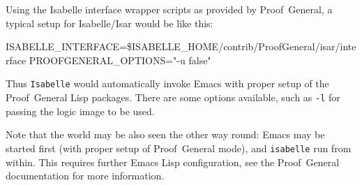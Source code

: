 Using the Isabelle interface wrapper scripts as provided by Proof~General, a
typical setup for Isabelle/Isar would be like this:
\begin{ttbox}
ISABELLE_INTERFACE=\$ISABELLE_HOME/contrib/ProofGeneral/isar/interface
PROOFGENERAL_OPTIONS="-u false"
\end{ttbox}
Thus \texttt{Isabelle} would automatically invoke Emacs with proper setup of
the Proof~General Lisp packages.  There are some options available, such as
\texttt{-l} for passing the logic image to be used.

\medskip Note that the world may be also seen the other way round: Emacs may
be started first (with proper setup of Proof~General mode), and
\texttt{isabelle} run from within.  This requires further Emacs Lisp
configuration, see the Proof~General documentation \cite{proofgeneral} for
more information.

